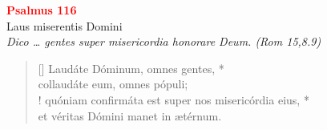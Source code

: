 
\def\greinitialformat#1{%
{\fontsize{39}{39}\selectfont #1}%
}




\vspace{0.3cm}
\begin{center}
 \textcolor{red}{\large \bf Psalmus 116}\\
Laus miserentis Domini\\
\textit{\small Dico … gentes super misericordia honorare Deum. (Rom 15,8.9)}
\end{center}
\begin{verse}[\versewidth]
Laudáte Dóminum, omnes gentes, *\\
collaudáte eum, omnes pópuli;\\!
\vin  quóniam confirmáta \verselinebreak est super nos misericórdia eius, *\\
\vin  et véritas Dómini manet in ætérnum.
\end{verse}
\vspace{1cm}